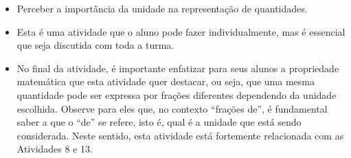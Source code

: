 \begin{multicols}{2}
\begin{objetivos}[label=chap2-ativ19]{}{}
\begin{itemize} %
    \item       Perceber a importância da unidade na representação de quantidades.
\end{itemize} %

\end{objetivos}

\begin{orientacoes}
\begin{itemize} %
    \item       Esta é uma atividade que o aluno pode fazer individualmente, mas é essencial que seja discutida com toda a turma.
    \item       No final da atividade, é importante enfatizar para seus alunos a propriedade matemática que esta atividade quer destacar, ou seja, que uma mesma quantidade pode ser expressa por frações diferentes dependendo da unidade escolhida. Observe para eles que, no contexto       ``frações de'', é fundamental saber a que o       ``de''     se refere, isto é, qual é a unidade que está sendo considerada. Neste sentido, esta atividade está fortemente relacionada com as Atividades 8 e 13.
\end{itemize} %


\end{orientacoes}


\end{multicols}
